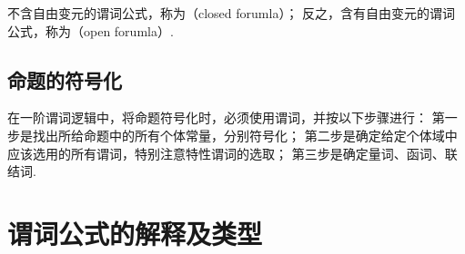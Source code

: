 不含自由变元的谓词公式，称为（closed forumla）；
反之，含有自由变元的谓词公式，称为（open forumla）.

\subsection{命题的符号化}
在一阶谓词逻辑中，将命题符号化时，必须使用谓词，并按以下步骤进行：
第一步是找出所给命题中的所有个体常量，分别符号化；
第二步是确定给定个体域中应该选用的所有谓词，特别注意特性谓词的选取；
第三步是确定量词、函词、联结词.


\section{谓词公式的解释及类型}
